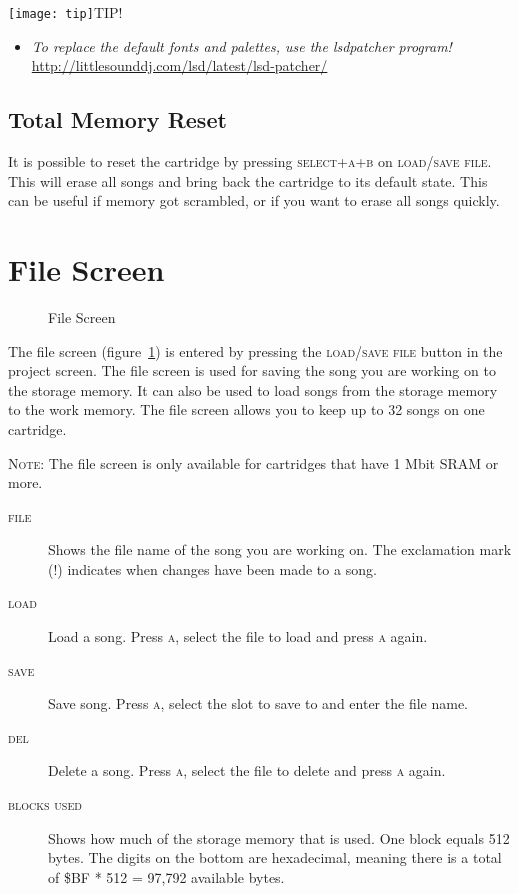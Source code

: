 \texttt{[image: tip]}TIP!
\begin{itemize}
\item \textit{To replace the default fonts and palettes, use the lsdpatcher program!} \url{http://littlesounddj.com/lsd/latest/lsd-patcher/}
\end{itemize}

\subsection{Total Memory Reset}
\label{total-memory-reset}

It is possible to reset the cartridge by pressing \textsc{select+a+b} on \textsc{load/save file}. This will erase all songs and bring back the cartridge to its default state. This can be useful if memory got scrambled, or if you want to erase all songs quickly.

\section{File Screen}

\begin{figure}[htpb]
	\begin{center}
	\end{center}
	\caption{File Screen}
	\label{fig:file}
\end{figure}

The file screen (figure~\ref{fig:file}) is entered by pressing the \textsc{load/save file} button in the project screen. The file screen is used for saving the song you are working on to the storage memory. It can also be used to load songs from the storage memory to the work memory. The file screen allows you to keep up to 32 songs on one cartridge.

\textsc{Note}: The file screen is only available for cartridges that have 1 Mbit SRAM or more.

\begin{description}
	\item[\textsc{file}] Shows the file name of the song you are working on. The exclamation mark (\textsc{!}) indicates when changes have been made to a song.
	\item[\textsc{load}] Load a song. Press \textsc{a}, select the file to load and press \textsc{a} again.
	\item[\textsc{save}] Save song. Press \textsc{a}, select the slot to save to and enter the file name.
	\item[\textsc{del}] Delete a song. Press \textsc{a}, select the file to delete and press \textsc{a} again.
	\item[\textsc{blocks used}] Shows how much of the storage memory that is used. One block equals 512 bytes. The digits on the bottom are hexadecimal, meaning there is a total of \$BF * 512 = 97,792 available bytes.
\end{description}

